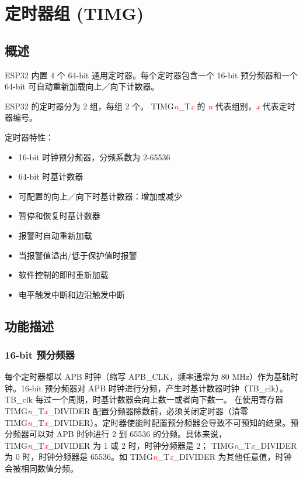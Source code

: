 \documentclass[main\_\_CN.tex]{subfiles}
\begin{document}
\hypertarget{timg}{}
\chapter{定时器组 (TIMG)}
\label{mod:timg}

\section{概述}
ESP32 内置 4 个 64-bit 通用定时器。每个定时器包含一个 16-bit 预分频器和一个 64-bit 可自动重新加载向上／向下计数器。

ESP32 的定时器分为 2 组，每组 2 个。 TIMG\textcolor{red}{\it{n}}\_T\textcolor{red}{\it{x}} 的 \textcolor{red}{\it{n}} 代表组别，\textcolor{red}{\it{x}} 代表定时器编号。 

定时器特性：
\begin{itemize}
    \item 16-bit 时钟预分频器，分频系数为 2-65536
    \item 64-bit 时基计数器
    \item 可配置的向上／向下时基计数器：增加或减少
    \item 暂停和恢复时基计数器
    \item 报警时自动重新加载
    \item 当报警值溢出/低于保护值时报警
    \item 软件控制的即时重新加载
    \item 电平触发中断和边沿触发中断
\end{itemize}

\section{功能描述}

\subsection{16-bit 预分频器}
每个定时器都以 APB 时钟（缩写 APB\_CLK，频率通常为 80 MHz）作为基础时钟。16-bit 预分频器对 APB 时钟进行分频，产生时基计数器时钟（TB\_clk）。 TB\_clk 每过一个周期，时基计数器会向上数一或者向下数一。
在使用寄存器 TIMG\textcolor{red}{\it{n}}\_T\textcolor{red}{\it{x}}\_DIVIDER 配置分频器除数前，必须关闭定时器（清零TIMG\textcolor{red}{\it{n}}\_T\textcolor{red}{\it{x}}\_DIVIDER）。定时器使能时配置预分频器会导致不可预知的结果。预分频器可以对 APB 时钟进行 2 到 65536 的分频。具体来说， TIMG\textcolor{red}{\it{n}}\_T\textcolor{red}{\it{x}}\_DIVIDER 为 1 或 2 时，时钟分频器是 2； TIMG\textcolor{red}{\it{n}}\_T\textcolor{red}{\it{x}}\_DIVIDER 为 0 时，时钟分频器是 65536。如 TIMG\textcolor{red}{\it{n}}\_T\textcolor{red}{\it{x}}\_DIVIDER 为其他任意值，时钟会被相同数值分频。
\end{document}
